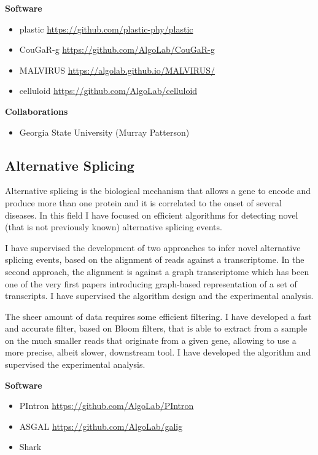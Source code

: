 \documentclass[11pt,a4paper,roman]{moderncv}
\begin{document}
\textbf{Software}

\begin{itemize}
	\item
	      plastic \url{https://github.com/plastic-phy/plastic}
	\item
	      CouGaR-g \url{https://github.com/AlgoLab/CouGaR-g}
	\item
	      MALVIRUS \url{https://algolab.github.io/MALVIRUS/}
	\item
	      celluloid \url{https://github.com/AlgoLab/celluloid}
\end{itemize}

\textbf{Collaborations}

\begin{itemize}
	\item
	      Georgia State University (Murray Patterson)
\end{itemize}

\subsection{Alternative Splicing}\label{splicing}

Alternative splicing is the biological mechanism that allows a gene to encode
and produce more than one protein and it is correlated to the onset of several diseases.
In this field I have focused on efficient algorithms for detecting novel (that
is not previously known) alternative splicing events.

I have supervised the development of two approaches to infer novel alternative
splicing events, based on the alignment of reads against a transcriptome.
In the second approach, the alignment is against a graph transcriptome which has
been one of the very first papers introducing graph-based representation of a
set of transcripts.
I have supervised the algorithm design and the experimental analysis.

The sheer amount of data requires some efficient filtering.
I have developed a fast and accurate filter, based on Bloom filters, that is
able to extract from a sample on the much smaller reads that originate from a
given gene, allowing to use a more precise, albeit slower, downstream tool.
I have developed the algorithm and supervised the experimental analysis.


\textbf{Software}

\begin{itemize}
	\item
	      PIntron \url{https://github.com/AlgoLab/PIntron}
	\item
	      ASGAL \url{https://github.com/AlgoLab/galig}
	\item
	      Shark
\end{itemize}
\end{document}
